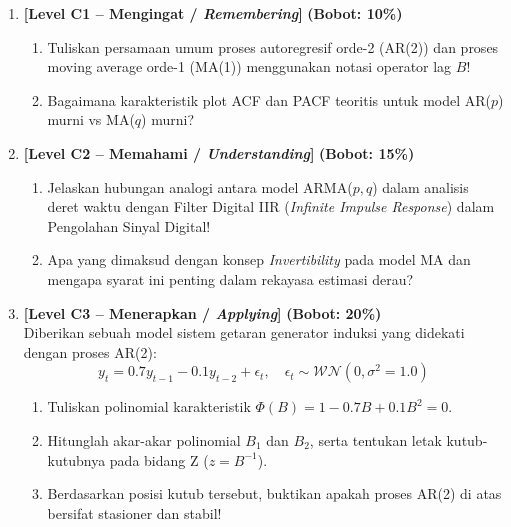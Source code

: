 \documentclass[11pt,a4paper]{article}
\begin{document}
\begin{enumerate}[leftmargin=1.5em, label=\textbf{Soal \arabic*.}]

    \item \textbf{[Level C1 -- Mengingat / \textit{Remembering}]} \hfill \textbf{(Bobot: 10\%)}
    \begin{enumerate}[label=\alph*.]
        \item Tuliskan persamaan umum proses autoregresif orde-2 (AR(2)) dan proses moving average orde-1 (MA(1)) menggunakan notasi operator lag $B$!
        \item Bagaimana karakteristik plot ACF dan PACF teoritis untuk model AR($p$) murni vs MA($q$) murni?
    \end{enumerate}

    \vspace{0.3cm}

    \item \textbf{[Level C2 -- Memahami / \textit{Understanding}]} \hfill \textbf{(Bobot: 15\%)}
    \begin{enumerate}[label=\alph*.]
        \item Jelaskan hubungan analogi antara model ARMA($p,q$) dalam analisis deret waktu dengan Filter Digital IIR (\textit{Infinite Impulse Response}) dalam Pengolahan Sinyal Digital!
        \item Apa yang dimaksud dengan konsep \textit{Invertibility} pada model MA dan mengapa syarat ini penting dalam rekayasa estimasi derau?
    \end{enumerate}

    \vspace{0.3cm}

    \item \textbf{[Level C3 -- Menerapkan / \textit{Applying}]} \hfill \textbf{(Bobot: 20\%)} \\
    Diberikan sebuah model sistem getaran generator induksi yang didekati dengan proses AR(2):
    \begin{equation*}
        y_t = 0.7 y_{t-1} - 0.1 y_{t-2} + \epsilon_t, \quad \epsilon_t \sim \mathcal{WN}(0, \sigma^2 = 1.0)
    \end{equation*}
    \begin{enumerate}[label=\alph*.]
        \item Tuliskan polinomial karakteristik $\Phi(B) = 1 - 0.7B + 0.1B^2 = 0$.
        \item Hitunglah akar-akar polinomial $B_1$ dan $B_2$, serta tentukan letak kutub-kutubnya pada bidang Z ($z = B^{-1}$).
        \item Berdasarkan posisi kutub tersebut, buktikan apakah proses AR(2) di atas bersifat stasioner dan stabil!
    \end{enumerate}


\end{enumerate}
\end{document}
